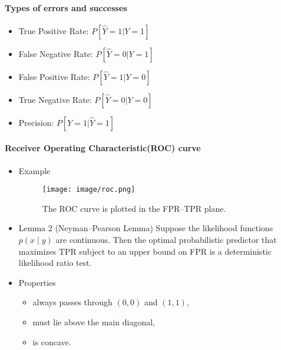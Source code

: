 \documentclass[a4paper]{article}
\begin{document}
\paragraph{Types of errors and successes}
\begin{itemize}
    \item True Positive Rate: $P[\hat{Y} = 1| Y=1]$
    \item False Negative Rate: $P[\hat{Y} = 0| Y=1]$
    \item False Positive Rate: $P[\hat{Y} = 1| Y=0]$
    \item True Negative Rate: $P[\hat{Y} = 0| Y=0]$
    \item Precision: $P[Y = 1| \hat{Y}=1]$
\end{itemize}

\paragraph{Receiver Operating Characteristic(ROC) curve}

\begin{itemize}
    \item Example
    \begin{figure} [H]
        \centering
        \texttt{[image: image/roc.png]}
        \caption{The ROC curve is plotted in the FPR–TPR plane.}
    \end{figure}
    \item Lemma 2 (Neyman–Pearson Lemma)
Suppose the likelihood functions $p(x \mid y)$ are continuous. Then the optimal probabilistic predictor that maximizes TPR subject to an upper bound on FPR is a deterministic likelihood ratio test.
    \item Properties
        \begin{itemize}
            \item always passes through $(0,0)$ and $(1,1)$,
            \item must lie above the main diagonal,
            \item is concave.
        \end{itemize}
\end{itemize}
\end{document}
